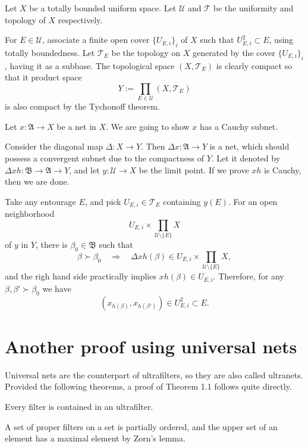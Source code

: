 \documentclass[12pt]{article}
\begin{document}
\begin{pf}[2 of Theorem 1.1.]
Let $X$ be a totally bounded uniform space.
Let $\mathcal{U}$ and $\mathcal{T}$ be the uniformity and topology of $X$ respectively.

For $E\in\mathcal{U}$, associate a finite open cover $\{U_{E,i}\}_i$ of $X$ such that $U_{E,i}^2\subset E$, using totally boundedness.
Let $\mathcal{T}_E$ be the topology on $X$ generated by the cover $\{U_{E,i}\}_i$, having it as a subbase.
The topological space $(X,\mathcal{T}_E)$ is clearly compact so that it product space
\[Y:=\prod_{E\in\mathcal{U}}(X,\mathcal{T}_E)\]
is also compact by the Tychonoff theorem.

Let $x:\mathfrak{A}\to X$ be a net in $X$.
We are going to show $x$ has a Cauchy subnet.

Consider the diagonal map $\Delta:X\to Y$.
Then $\Delta x:\mathfrak{A}\to Y$ is a net, which should possess a convergent subnet due to the compactness of $Y$.
Let it denoted by $\Delta xh:\mathfrak{B}\to\mathfrak{A}\to Y$, and let $y:\mathcal{U}\to X$ be the limit point.
If we prove $xh$ is Cauchy, then we are done.

Take any entourage $E$, and pick $U_{E,i}\in\mathcal{T}_E$ containing $y(E)$.
For an open neighborhood
\[U_{E,i}\times\prod_{\mathcal{U}\setminus\{E\}}X\]
of $y$ in $Y$, there is $\beta_0\in\mathfrak{B}$ such that
\[\beta\succ\beta_0\quad\Rightarrow\quad\Delta xh(\beta)\in U_{E,i}\times\prod_{\mathcal{U}\setminus\{E\}}X,\]
and the righ hand side practically implies $xh(\beta)\in U_{E,i}$.
Therefore, for any $\beta,\beta'\succ\beta_0$ we have
\[(x_{h(\beta)},x_{h(\beta')})\in U_{E,i}^2\subset E.\]
\end{pf}


\section{Another proof using universal nets}

Universal nets are the counterpart of ultrafilters, so they are also called ultranets.
Provided the following theorems, a proof of Theorem 1.1 follows quite directly.

\begin{thm}
Every filter is contained in an ultrafilter.
\end{thm}
\begin{pf}
A set of proper filters on a set is partially ordered, and the upper set of an element has a maximal element by Zorn's lemma.
\end{pf}
\end{document}
